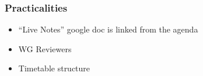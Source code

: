 \begin{frame}
\frametitle{Practicalities}

\begin{itemize}
\item ``Live Notes'' google doc is linked from the agenda
\item WG Reviewers 
\item Timetable structure
\end{itemize}

\end{frame}


